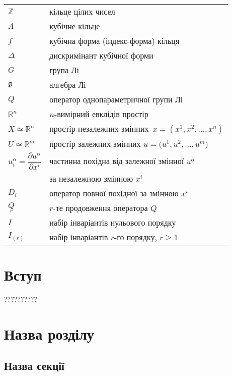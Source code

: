 \documentclass{thesis}
\begin{document}
\begin{tabular}{ll}
$\mathbb{Z}$ & кільце цілих чисел\\
$\Lambda$ & кубічне кільце\\
$f$ & кубічна форма (індекс-форма) кільця\\
$\Delta$ & дискримінант кубічної форми\\
$G$ & група Лі\\
$\mathfrak g$ & алгебра Лі\\
$Q$ & оператор однопараметричної групи Лі\\[1mm]
$\mathbb R^n$ & $n$-вимірний евклідів простір\\[1mm]
$X\simeq {\mathbb R}^n$ & простір незалежних змінних~$x=(x^1,x^2,\ldots, x^n)$ \\[1mm]
$U\simeq {\mathbb R}^m$ & простір залежних змінних $u=\big(u^1, u^2, \ldots, u^m\big)$\\[1mm]
$u^\alpha_i=\dfrac{\partial u^\alpha}{\partial x^i}$ & частинна похідна від залежної змінної $u^\alpha$\\[1mm]
& за незалежною змінною $x^i$\\[1mm]
$D_{i}$ & оператор повної похідної за змінною $x^{i}$\\[1mm]
$\underset{r}{Q}$ & $r$-те продовження оператора $Q$\\[1mm]
$I$ & набір інваріантів нульового порядку\\[1mm]
$I_{(r)}$ & набір інваріантів $r$-го порядку, $r\geq 1$

\end{tabular}


\newpage

\chapter*{Вступ}\label{Introduction}

??????????
\cite{boyko-thesis,boyko2021,PopovychBoykoNesterenkoLutfullin2003}

\newpage

\chapter{Назва розділу}\label{chaper1}

\section{Назва секції}\label{section1.1}
\end{document}
